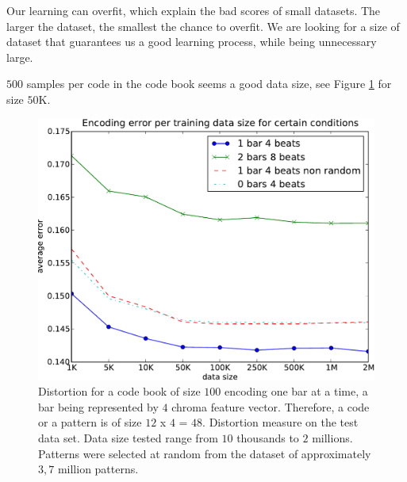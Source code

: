 \documentclass{article}
\begin{document}
Our learning can overfit, which explain the bad scores of small datasets.
The larger the dataset, the smallest the chance to overfit.
We are looking for a size of dataset that guarantees us a good learning
process, while being unnecessary large.

$500$ samples per code in the code book seems a good data size, see
Figure \ref{fig:sizes} for size $50$K.

\begin{figure}[htb]
\begin{center}
\includegraphics[width=.99\columnwidth]{data_sizes}
\end{center}
\caption{{Distortion for a code book of size $100$ encoding one bar
at a time, a bar being represented by $4$ chroma feature vector.
Therefore, a code or a pattern is of size $12$ x $4$ = $48$.
Distortion measure on the test data set. Data size tested range
from $10$ thousands to $2$ millions. Patterns were selected at
random from the dataset of approximately $3,7$ million patterns.}}
\label{fig:sizes}
\end{figure}
\end{document}
